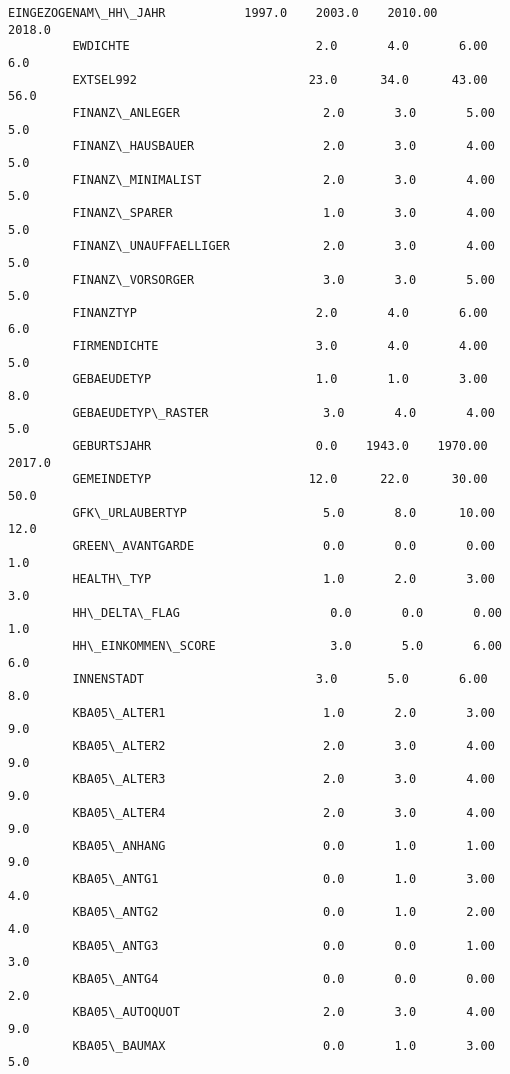 \documentclass[11pt]{article}
\begin{document}
\begin{Verbatim}[commandchars=\\\{\}]
         EINGEZOGENAM\_HH\_JAHR           1997.0    2003.0    2010.00     2018.0  
         EWDICHTE                          2.0       4.0       6.00        6.0  
         EXTSEL992                        23.0      34.0      43.00       56.0  
         FINANZ\_ANLEGER                    2.0       3.0       5.00        5.0  
         FINANZ\_HAUSBAUER                  2.0       3.0       4.00        5.0  
         FINANZ\_MINIMALIST                 2.0       3.0       4.00        5.0  
         FINANZ\_SPARER                     1.0       3.0       4.00        5.0  
         FINANZ\_UNAUFFAELLIGER             2.0       3.0       4.00        5.0  
         FINANZ\_VORSORGER                  3.0       3.0       5.00        5.0  
         FINANZTYP                         2.0       4.0       6.00        6.0  
         FIRMENDICHTE                      3.0       4.0       4.00        5.0  
         GEBAEUDETYP                       1.0       1.0       3.00        8.0  
         GEBAEUDETYP\_RASTER                3.0       4.0       4.00        5.0  
         GEBURTSJAHR                       0.0    1943.0    1970.00     2017.0  
         GEMEINDETYP                      12.0      22.0      30.00       50.0  
         GFK\_URLAUBERTYP                   5.0       8.0      10.00       12.0  
         GREEN\_AVANTGARDE                  0.0       0.0       0.00        1.0  
         HEALTH\_TYP                        1.0       2.0       3.00        3.0  
         HH\_DELTA\_FLAG                     0.0       0.0       0.00        1.0  
         HH\_EINKOMMEN\_SCORE                3.0       5.0       6.00        6.0  
         INNENSTADT                        3.0       5.0       6.00        8.0  
         KBA05\_ALTER1                      1.0       2.0       3.00        9.0  
         KBA05\_ALTER2                      2.0       3.0       4.00        9.0  
         KBA05\_ALTER3                      2.0       3.0       4.00        9.0  
         KBA05\_ALTER4                      2.0       3.0       4.00        9.0  
         KBA05\_ANHANG                      0.0       1.0       1.00        9.0  
         KBA05\_ANTG1                       0.0       1.0       3.00        4.0  
         KBA05\_ANTG2                       0.0       1.0       2.00        4.0  
         KBA05\_ANTG3                       0.0       0.0       1.00        3.0  
         KBA05\_ANTG4                       0.0       0.0       0.00        2.0  
         KBA05\_AUTOQUOT                    2.0       3.0       4.00        9.0  
         KBA05\_BAUMAX                      0.0       1.0       3.00        5.0  

\end{Verbatim}
\end{document}

